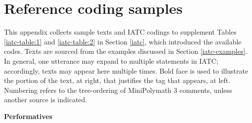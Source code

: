 \documentclass[smallextended,oneside]{svjour3}       %
\begin{document}
\clearpage
\appendix
\section{Reference coding samples} \label{app:reference-coding-samples}
This appendix collects sample texts and IATC codings to
supplement Tables \ref{iatc-table:1} and \ref{iatc-table:2} in Section
\ref{iatc}, which introduced the available codes.  Texts are sourced from the
examples discussed in Section \ref{iatc-examples}.    In general, one utterance may
expand to multiple statements in IATC; accordingly, texts may
appear here multiple times.  Bold face is used to illustrate the
portion of the text, at right, that justifies the tag that appears, at
left.   Numbering refers
to the tree-ordering of MiniPolymath 3 comments, unless another source
is indicated.

\medskip

{\centering
\textbf{Performatives} 

\par}
\medskip
\end{document}
